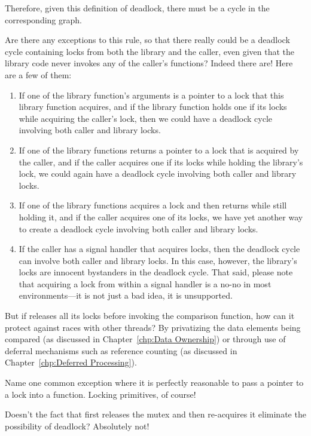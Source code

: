 	Therefore, given this definition of deadlock, there must
	be a cycle in the corresponding graph.

\QuickQ{}
	Are there any exceptions to this rule, so that there really could be
	a deadlock cycle containing locks from both the library and
	the caller, even given that the library code never invokes
	any of the caller's functions?
\QuickA{}
	Indeed there are!
	Here are a few of them:
	\begin{enumerate}
	\item	If one of the library function's arguments is a pointer
		to a lock that this library function acquires, and if
		the library function holds one if its locks while
		acquiring the caller's lock, then we could have a
		deadlock cycle involving both caller and library locks.
	\item	If one of the library functions returns a pointer to
		a lock that is acquired by the caller, and if the
		caller acquires one if its locks while holding the
		library's lock, we could again have a deadlock
		cycle involving both caller and library locks.
	\item	If one of the library functions acquires a lock and
		then returns while still holding it, and if the caller
		acquires one of its locks, we have yet another way
		to create a deadlock cycle involving both caller
		and library locks.
	\item	If the caller has a signal handler that acquires
		locks, then the deadlock cycle can involve both
		caller and library locks.
		In this case, however, the library's locks are
		innocent bystanders in the deadlock cycle.
		That said, please note that acquiring a lock from
		within a signal handler is a no-no in most
		environments---it is not just a bad idea, it
		is unsupported.
	\end{enumerate}

\QuickQ{}
	But if  releases all its locks before invoking
	the comparison function, how can it protect against races
	with other  threads?
\QuickA{}
	By privatizing the data elements being compared
	(as discussed in Chapter~\ref{chp:Data Ownership})
	or through use of deferral mechanisms such as
	reference counting (as discussed in
	Chapter~\ref{chp:Deferred Processing}).

\QuickQ{}
	Name one common exception where it is perfectly reasonable
	to pass a pointer to a lock into a function.
\QuickA{}
	Locking primitives, of course!

\QuickQ{}
	Doesn't the fact that  first releases the
	mutex and then re-acquires it eliminate the possibility of deadlock?
\QuickA{}
	Absolutely not!

